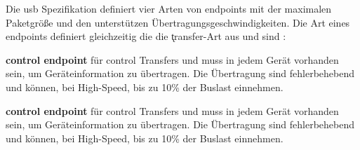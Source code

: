 Die \acrshort{usb} Spezifikation definiert vier Arten von endpoints mit der maximalen Paketgrö{\ss}e und den unterstützen Übertragungsgeschwindigkeiten. Die Art eines endpoints definiert gleichzeitig die die \k{transfer}-Art aus  und sind \cite[Kapitel~8]{usb_developer_guide}:
\begin{compactitem}
    \item \textbf{control endpoint} für control Transfers und muss in jedem Gerät vorhanden sein, um Geräteinformation zu übertragen. Die Übertragung sind fehlerbehebend und können, bei High-Speed, bis zu 10\% der Buslast einnehmen.
    \item \textbf{control endpoint} für control Transfers und muss in jedem Gerät vorhanden sein, um Geräteinformation zu übertragen. Die Übertragung sind fehlerbehebend und können, bei High-Speed, bis zu 10\% der Buslast einnehmen.
\end{compactitem}

